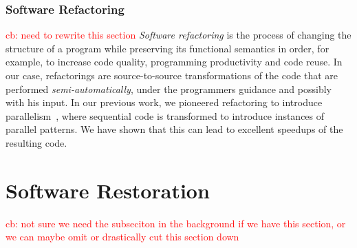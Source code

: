 \subsubsection*{Software Refactoring}
\textcolor{red}{cb: need to rewrite this section}
\noindent
\emph{Software refactoring} is the process of changing the structure of a program while preserving
its functional semantics in order, for example, to increase code quality, programming
productivity and code reuse. In our case, refactorings are source-to-source transformations of the code that are performed \emph{semi-automatically}, under the programmers guidance and possibly with his input. In our previous work, we pioneered refactoring to introduce parallelism~\cite{rpl}, where sequential code is transformed to introduce instances of parallel patterns. We have shown that this can lead to excellent speedups of the resulting code.

\section{Software Restoration}
\textcolor{red}{cb: not sure we need the subseciton in the background if we have this section, or we can maybe omit or drastically cut this section down}

